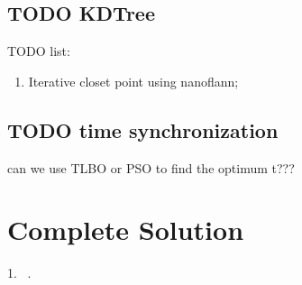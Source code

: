 \documentclass[a4paper]{report}
\begin{document}
\section{TODO KDTree}
TODO list:
\begin{enumerate}
\item Iterative closet point using nanoflann;
\end{enumerate}

\section{TODO time synchronization}
can we use TLBO or PSO to find the optimum t???





\chapter{Complete Solution}
1. ~\cite{schmidt2005calibration}.

 

\end{document}
